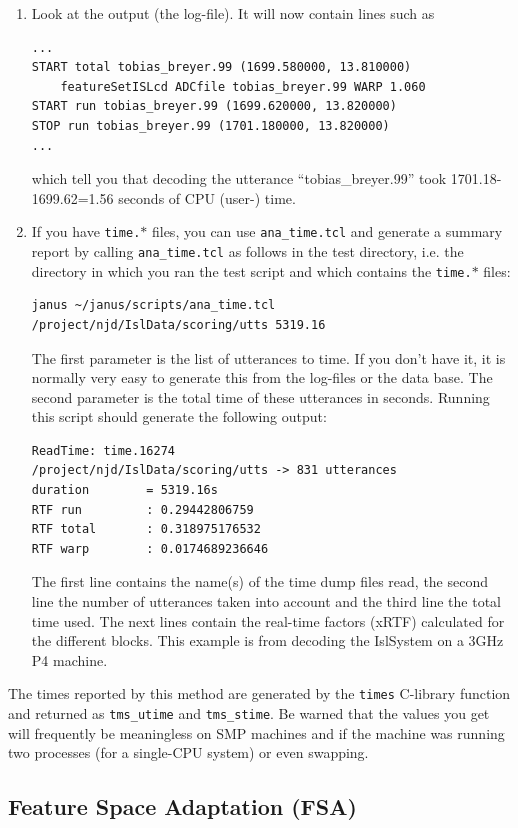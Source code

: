 \begin{enumerate}
\item Look at the output (the log-file). It will now contain lines such as
\begin{verbatim}
...
START total tobias_breyer.99 (1699.580000, 13.810000)
    featureSetISLcd ADCfile tobias_breyer.99 WARP 1.060
START run tobias_breyer.99 (1699.620000, 13.820000)
STOP run tobias_breyer.99 (1701.180000, 13.820000)
...
\end{verbatim}
  which tell you that decoding the utterance ``tobias\_breyer.99'' took
  1701.18-1699.62=1.56 seconds of CPU (user-) time.
\item If you have \texttt{time.$\ast$} files, you can use 
  \texttt{ana\_time.tcl} and generate a summary report by calling 
  \texttt{ana\_time.tcl} as follows in the test directory, i.e. the 
  directory in which you ran the test script and which contains the 
  \texttt{time.$\ast$} files:
  \begin{verbatim}
janus ~/janus/scripts/ana_time.tcl /project/njd/IslData/scoring/utts 5319.16
  \end{verbatim}
  The first parameter is the list of utterances to time. If you don't have
  it, it is normally very easy to generate this from the log-files or
  the data base. The second parameter is the total time of these utterances
  in seconds. Running this script should generate the following output: 
  \begin{verbatim}
ReadTime: time.16274
/project/njd/IslData/scoring/utts -> 831 utterances
duration        = 5319.16s
RTF run         : 0.29442806759
RTF total       : 0.318975176532
RTF warp        : 0.0174689236646
  \end{verbatim}
  The first line contains the name(s) of the time dump files read, the
  second  line the  number of  utterances  taken into account and  the
  third line the total time used. The next lines contain the real-time
  factors (xRTF) calculated for  the different blocks. This example is
  from decoding the IslSystem on a 3GHz P4 machine.
\end{enumerate}

The times reported by this method are  generated by the \texttt{times}
C-library function     and  returned  as     \texttt{tms\_utime}   and
\texttt{tms\_stime}. Be warned that the values you get will frequently
be meaningless on  SMP  machines and  if the  machine was  running two
processes (for a single-CPU system) or even swapping.

\subsection{Feature Space Adaptation (FSA)}

